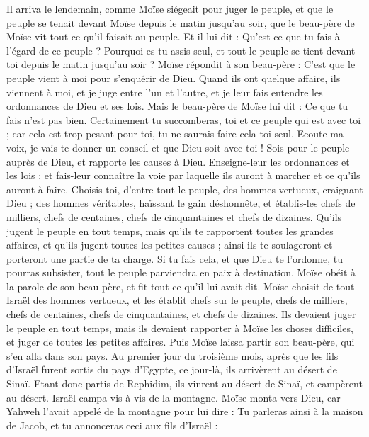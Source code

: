 \begin{multicols}{2}
Il arriva le lendemain, comme Moïse siégeait pour juger le peuple, et que le peuple se tenait devant Moïse depuis le matin jusqu'au soir,
que le beau-père de Moïse vit tout ce qu'il faisait au peuple. Et il lui dit : Qu'est-ce que tu fais à l'égard de ce peuple ? Pourquoi es-tu assis seul, et tout le peuple se tient devant toi depuis le matin jusqu'au soir ?
Moïse répondit à son beau-père : C'est que le peuple vient à moi pour s'enquérir de Dieu.
Quand ils ont quelque affaire, ils viennent à moi, et je juge entre l'un et l'autre, et je leur fais entendre les ordonnances de Dieu et ses lois.
Mais le beau-père de Moïse lui dit : Ce que tu fais n'est pas bien.
Certainement tu succomberas, toi et ce peuple qui est avec toi ; car cela est trop pesant pour toi, tu ne saurais faire cela toi seul.
Ecoute ma voix, je vais te donner un conseil et que Dieu soit avec toi ! Sois pour le peuple auprès de Dieu, et rapporte les causes à Dieu.
Enseigne-leur les ordonnances et les lois ; et fais-leur connaître la voie par laquelle ils auront à marcher et ce qu'ils auront à faire.
Choisis-toi, d'entre tout le peuple, des hommes vertueux, craignant Dieu ; des hommes véritables, haïssant le gain déshonnête, et établis-les chefs de milliers, chefs de centaines, chefs de cinquantaines et chefs de dizaines.
Qu'ils jugent le peuple en tout temps, mais qu'ils te rapportent toutes les grandes affaires, et qu'ils jugent toutes les petites causes ; ainsi ils te soulageront et porteront une partie de ta charge.
Si tu fais cela, et que Dieu te l’ordonne, tu pourras subsister, tout le peuple parviendra en paix à destination.
Moïse obéit à la parole de son beau-père, et fit tout ce qu'il lui avait dit.
Moïse choisit de tout Israël des hommes vertueux, et les établit chefs sur le peuple, chefs de milliers, chefs de centaines, chefs de cinquantaines, et chefs de dizaines.
Ils devaient juger le peuple en tout temps, mais ils devaient rapporter à Moïse les choses difficiles, et juger de toutes les petites affaires.
Puis Moïse laissa partir son beau-père, qui s'en alla dans son pays.
\VerseOne{}Au premier jour du troisième mois, après que les fils d'Israël furent sortis du pays d'Egypte, ce jour-là, ils arrivèrent au désert de Sinaï.
Etant donc partis de Rephidim, ils vinrent au désert de Sinaï, et campèrent au désert. Israël campa vis-à-vis de la montagne.
Moïse monta vers Dieu, car Yahweh l'avait appelé de la montagne pour lui dire : Tu parleras ainsi à la maison de Jacob, et tu annonceras ceci aux fils d'Israël :

\end{multicols}
